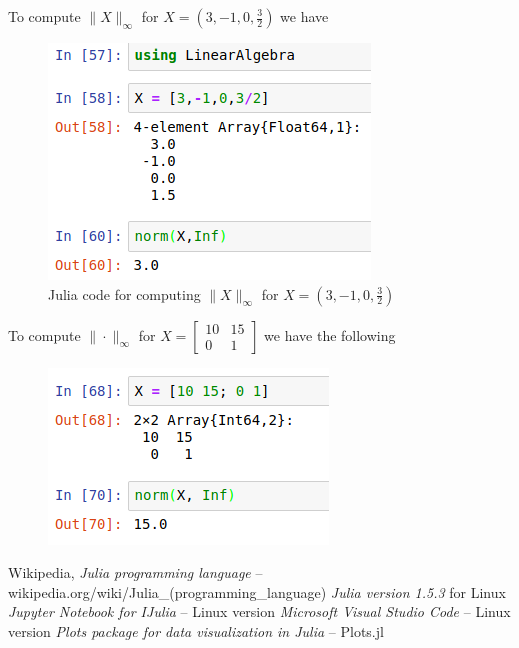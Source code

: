 \documentclass[a4paper,12pt,openany]{book}
\begin{document}
\begin{soln}
To compute $\|X\|_\infty$ for $X = \left( 3,-1, 0,\frac{3}{2} \right)$ we have
\begin{figure}[H]
	\centering
	\includegraphics[width= .7\linewidth]{pic21}
	\caption{Julia code for computing $ \|X\|_\infty$ for $X = \left( 3,-1, 0,\frac{3}{2} \right)$}
\end{figure}
To compute $\| \cdot\|_\infty$ for $X = \begin{bmatrix}
10 & 15\\ 0 & 1
\end{bmatrix}$ we have the following
\begin{figure}[H]
	\centering
	\includegraphics[width= .7\linewidth]{pic22}
\end{figure}

\end{soln}

\begin{thebibliography}{9}
	 Wikipedia, \emph{Julia programming language} -- wikipedia.org/wiki/Julia\_(programming\_language)
	 \emph{Julia version 1.5.3} for Linux 
	 \emph{Jupyter Notebook for IJulia} -- Linux version 
	 \emph{Microsoft Visual Studio Code} -- Linux version
	 \emph{Plots package for data visualization in Julia} -- Plots.jl
\end{thebibliography}
\end{document}

